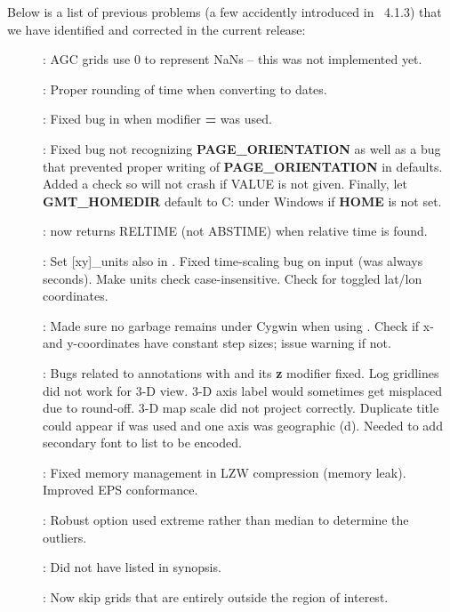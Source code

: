 Below is a list of previous problems (a few accidently introduced in \gmt\ 4.1.3)
that we have identified and corrected in the current release:

\begin{description}
\item []: AGC grids use 0 to represent NaNs -- this was not implemented yet.
\item []: Proper rounding of time when converting to dates.
\item []: Fixed bug in  when modifier \textbf{=} was used.
\item []: Fixed bug not recognizing \textbf{PAGE\_ORIENTATION} as well as a bug that
prevented proper writing of \textbf{PAGE\_ORIENTATION} in defaults.  Added a check so 
will not crash if VALUE is not given.  Finally, let \textbf{GMT\_HOMEDIR} default to C: under Windows
if \textbf{HOME} is not set.
\item []:  now returns RELTIME (not ABSTIME) when relative time is found.
\item []: Set [xy]\_units also in .
Fixed time-scaling bug on input (was always seconds).  Make units check case-insensitive. Check for toggled lat/lon coordinates.
\item []: Made sure no garbage remains under Cygwin when using .
Check if x- and y-coordinates have constant step sizes; issue warning if not.
\item []: Bugs related to annotations with  and its \textbf{z} modifier fixed.
Log gridlines did not work for 3-D view.  3-D axis label would sometimes get misplaced due to round-off.
3-D map scale did not project correctly.  Duplicate title could appear if  was used and one axis was geographic (d).
Needed to add secondary font to list to be encoded.
\item []: Fixed memory management in LZW compression (memory leak).  Improved EPS conformance.
\item []: Robust option used extreme rather than median to determine the outliers.
\item []: Did not have  listed in synopsis.
\item []: Now skip grids that are entirely outside the region of interest.

\end{description}
